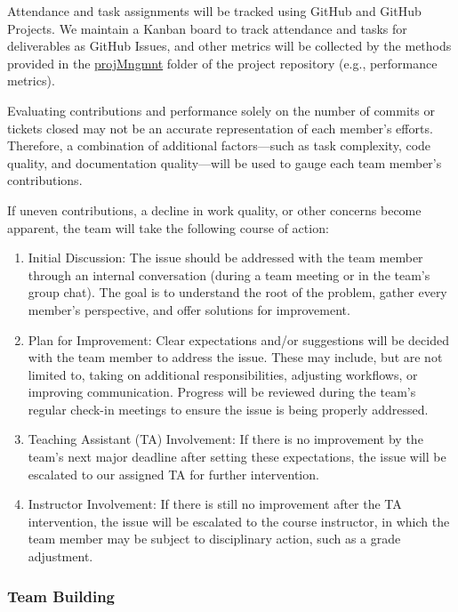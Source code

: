 \documentclass{article}
\begin{document}
Attendance and task assignments will be tracked using GitHub and GitHub
Projects. We maintain a Kanban board to track attendance and tasks for
deliverables as GitHub Issues, and other metrics will be collected by the
methods provided in the
\href{https://github.com/SumanyaG/Alkalytics/tree/main/docs/projMngmnt}{projMngmnt}
folder of the project repository (e.g., performance metrics).\newline

\noindent Evaluating contributions and performance solely on the number of
commits or tickets closed may not be an accurate representation of each member’s
efforts. Therefore, a combination of additional factors—such as task complexity,
code quality, and documentation quality—will be used to gauge each team member’s
contributions.\newline

\noindent If uneven contributions, a decline in work quality, or other concerns
become apparent, the team will take the following course of action:

\begin{enumerate}
    \item Initial Discussion: The issue should be addressed with the team member
    through an internal conversation (during a team meeting or in the team’s
    group chat). The goal is to understand the root of the problem, gather every
    member’s perspective, and offer solutions for improvement.
    \item Plan for Improvement: Clear expectations and/or suggestions will be
    decided with the team member to address the issue. These may include, but are
    not limited to, taking on additional responsibilities, adjusting workflows,
    or improving communication. Progress will be reviewed during the team’s
    regular check-in meetings to ensure the issue is being properly addressed.
    \item Teaching Assistant (TA) Involvement: If there is no improvement by the
    team's next major deadline after setting these expectations, the issue will
    be escalated to our assigned TA for further intervention.
    \item Instructor Involvement: If there is still no improvement after the TA
    intervention, the issue will be escalated to the course instructor, in which
    the team member may be subject to disciplinary action, such as a grade
    adjustment.
\end{enumerate}

\subsubsection*{Team Building}
\end{document}
